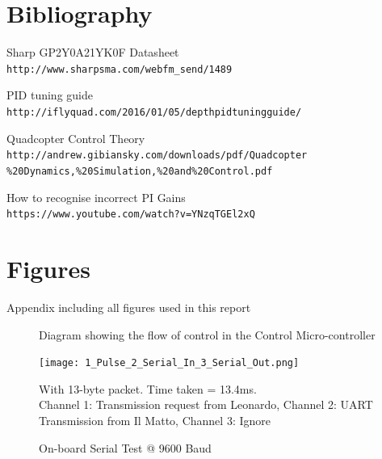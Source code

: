 \documentclass[a4paper,11pt]{article}
\begin{document}
\appendix
\newpage
\section{Bibliography}
\begin{thebibliography}{9}
 
Sharp GP2Y0A21YK0F Datasheet\\
\texttt{http://www.sharpsma.com/webfm\_send/1489}

PID tuning guide\\
\texttt{http://iflyquad.com/2016/01/05/depth\-pid\-tuning\-guide/}

Quadcopter Control Theory\\
\texttt{http://andrew.gibiansky.com/downloads/pdf/Quadcopter\\\%20Dynamics,\%20Simulation,\%20and\%20Control.pdf}

How to recognise incorrect PI Gains\\
\texttt{https://www.youtube.com/watch?v=YNzqTGEl2xQ}



\end{thebibliography}

\newpage
\section{Figures}
\label{app:Figures}
Appendix including all figures used in this report
\begin{figure}[!h]
    
    \caption{Diagram showing the flow of control in the Control Micro-controller}
    \label{fig:Control Flow}
\end{figure}
\newpage
\begin{figure}[!ht]
    \texttt{[image: 1\_Pulse\_2\_Serial\_In\_3\_Serial\_Out.png]}
    \caption{On-board Serial Test @ 9600 Baud}
    \medskip
    \small
    \centering
    With 13-byte packet. Time taken = 13.4ms.\\ Channel 1: Transmission request from Leonardo, Channel 2: UART Transmission from Il Matto, Channel 3: Ignore 
    \label{fig:9600 Baud}
\end{figure}
\end{document}
